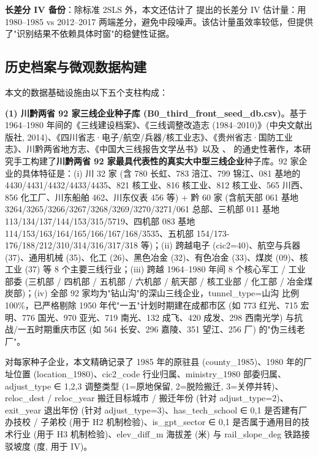 \textbf{长差分 IV 备份}：除标准 2SLS 外，本文还估计了 \citet{rothenberg2009} 提出的长差分 IV 估计量：用 1980--1985 vs 2012--2017 两端差分，避免中段噪声。该估计量虽效率较低，但提供了"识别结果不依赖具体时窗"的稳健性证据。

\subsection{历史档案与微观数据构建}\label{sec:strategy:data}

本文的数据基础设施由以下五个支柱构成：

\textbf{(1) 川黔两省 92 家三线企业种子库 (B0\_third\_front\_seed\_db.csv)}。基于 1964--1980 年间的《三线建设档案》、《三线调整改造志 (1984--2010)》(中央文献出版社, 2014)、《四川省志·电子/航空/兵器/核工业志》、《贵州省志·国防工业志》、川黔两省地方志、《中国大三线报告文学丛书》以及 \citet{陈东林2003}、\citet{董志凯2003} 的通史性著作，本研究手工构建了\textbf{川黔两省 92 家最具代表性的真实大中型三线企业}种子库。92 家企业的具体特征是：(i) 川 32 家 (含 780 长虹、783 涪江、799 锦江、081 基地的 4430/4431/4432/4433/4435、821 核工业、816 核工业、812 核工业、565 川西、856 化工厂、川东船舶 462、川东仪表 456 等) + 黔 60 家 (含航天部 061 基地 3264/3265/3266/3267/3268/3269/3270/3271/061 总部、三机部 011 基地 113/134/137/144/153/315/5719、四机部 083 基地 114/153/163/164/165/166/167/168/3535、五机部 154/173-176/188/212/310/314/316/317/318 等)；(ii) 跨越电子 (cic2=40)、航空与兵器 (37)、通用机械 (35)、化工 (26)、黑色冶金 (32)、有色冶金 (33)、煤炭 (09)、核工业 (37) 等 8 个主要三线行业；(iii) 跨越 1964--1980 年间 8 个核心军工 / 工业部委 (三机部 / 四机部 / 五机部 / 六机部 / 航天部 / 核工业部 / 化工部 / 冶金煤炭部)；(iv) 全部 92 家均为"钻山沟"的深山三线企业，tunnel\_type=山沟 比例 100\%，已严格剔除 1950 年代"一五"计划时期建在成都市区 (如 773 红光、715 宏明、776 国光、970 亚光、719 南光、132 成飞、420 成发、298 西南光学) 与抗战/一五时期重庆市区 (如 564 长安、296 嘉陵、351 望江、256 厂) 的"伪三线老厂"。

对每家种子企业，本文精确记录了 1985 年的原驻县 (county\_1985)、1980 年的厂址位置 (location\_1980)、cic2\_code 行业归属、ministry\_1980 部委归属、adjust\_type ∈ {1,2,3} 调整类型 (1=原地保留, 2=脱险搬迁, 3=关停并转)、reloc\_dest / reloc\_year 搬迁目标城市 / 搬迁年份 (针对 adjust\_type=2)、exit\_year 退出年份 (针对 adjust\_type=3)、has\_tech\_school ∈ {0,1} 是否建有厂办技校 / 子弟校 (用于 H2 机制检验)、is\_gpt\_sector ∈ {0,1} 是否属于通用目的技术行业 (用于 H3 机制检验)、elev\_diff\_m 海拔差 (米) 与 rail\_slope\_deg 铁路接驳坡度 (度, 用于 IV)。

